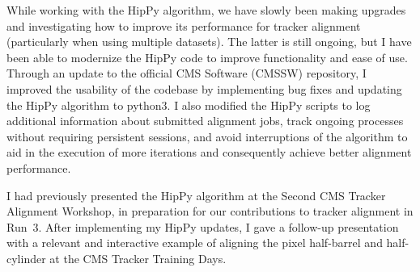 While working with the HipPy algorithm, we have slowly been making upgrades and investigating how to improve its performance for tracker alignment (particularly when using multiple datasets). The latter is still ongoing, but I have been able to modernize the HipPy code to improve functionality and ease of use. Through an update to the official CMS Software (CMSSW) repository, I improved the usability of the codebase by implementing bug fixes and updating the HipPy algorithm to python3. I also modified the HipPy scripts to log additional information about submitted alignment jobs, track ongoing processes without requiring persistent sessions, and avoid interruptions of the algorithm to aid in the execution of more iterations and consequently achieve better alignment performance. 

I had previously presented the HipPy algorithm at the Second CMS Tracker Alignment Workshop, in preparation for our contributions to tracker alignment in Run~3. After implementing my HipPy updates, I gave a follow-up presentation with a relevant and interactive example of aligning the pixel half-barrel and half-cylinder at the CMS Tracker Training Days.

